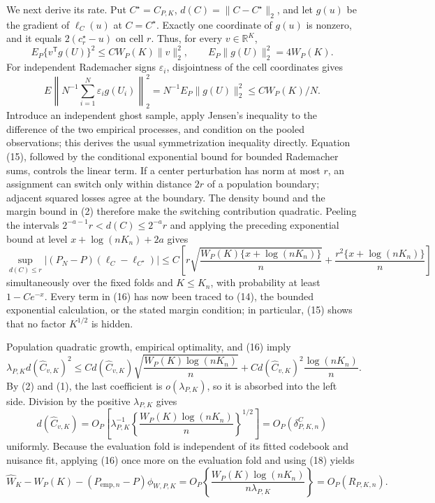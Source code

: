 We next derive its rate.  Put \(C^\star=C_{P,K}\), \(d(C)=\|C-C^\star\|_2\), and let \(g(u)\) be the gradient of \(\ell_C(u)\) at \(C=C^\star\).  Exactly one coordinate of \(g(u)\) is nonzero, and it equals \(2(c_r^\star-u)\) on cell \(r\).  Thus, for every \(v\in\mathbb R^K\),
\[
 E_P\{v^{\mathsf T}g(U)\}^2\leq C W_P(K)\|v\|_2^2,
 \qquad E_P\|g(U)\|_2^2=4W_P(K).                                                \tag{14}
\]
For independent Rademacher signs \(\varepsilon_i\), disjointness of the cell coordinates gives
\[
 E\left\|N^{-1}\sum_{i=1}^N\varepsilon_i g(U_i)\right\|_2^2
 =N^{-1}E_P\|g(U)\|_2^2\leq CW_P(K)/N.                                        \tag{15}
\]
Introduce an independent ghost sample, apply Jensen's inequality to the difference of the two empirical processes, and condition on the pooled observations; this derives the usual symmetrization inequality directly.  Equation (15), followed by the conditional exponential bound for bounded Rademacher sums, controls the linear term.  If a center perturbation has norm at most \(r\), an assignment can switch only within distance \(2r\) of a population boundary; adjacent squared losses agree at the boundary.  The density bound and the margin bound in (2) therefore make the switching contribution quadratic.  Peeling the intervals \(2^{-a-1}r<d(C)\leq2^{-a}r\) and applying the preceding exponential bound at level \(x+\log(nK_n)+2a\) gives
\[
 \sup_{d(C)\leq r}|(P_N-P)(\ell_C-\ell_{C^\star})|
 \leq C\left[r\sqrt{\frac{W_P(K)\{x+\log(nK_n)\}}{n}}
 +\frac{r^2\{x+\log(nK_n)\}}n\right]                                        \tag{16}
\]
simultaneously over the fixed folds and \(K\leq K_n\), with probability at least \(1-Ce^{-x}\).  Every term in (16) has now been traced to (14), the bounded exponential calculation, or the stated margin condition; in particular, (15) shows that no factor \(K^{1/2}\) is hidden.

Population quadratic growth, empirical optimality, and (16) imply
\[
 \lambda_{P,K}d(\widehat C_{v,K})^2
 \leq C d(\widehat C_{v,K})
 \sqrt{\frac{W_P(K)\log(nK_n)}n}
 +C d(\widehat C_{v,K})^2\frac{\log(nK_n)}n.                                   \tag{17}
\]
By (2) and (1), the last coefficient is \(o(\lambda_{P,K})\), so it is absorbed into the left side.  Division by the positive \(\lambda_{P,K}\) gives
\[
 d(\widehat C_{v,K})
 =O_P\!\left[\lambda_{P,K}^{-1}
 \left\{\frac{W_P(K)\log(nK_n)}n\right\}^{1/2}\right]
 =O_P(\delta^C_{P,K,n})                                                         \tag{18}
\]
uniformly.  Because the evaluation fold is independent of its fitted codebook and nuisance fit, applying (16) once more on the evaluation fold and using (18) yields
\[
 \widehat W_K-W_P(K)-(P_{\mathrm{emp},n}-P)\phi_{W,P,K}
 =O_P\!\left\{\frac{W_P(K)\log(nK_n)}{n\lambda_{P,K}}\right\}
 =O_P(R_{P,K,n}).                                                                 \tag{19}
\]

